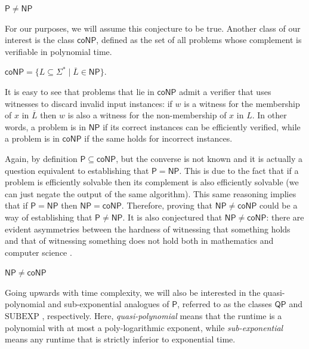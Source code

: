 \begin{conjecture}
  $\mathsf{P} \neq \mathsf{NP}$
\end{conjecture}

For our purposes, we will assume this conjecture to be true. Another class of our interest is the class $\mathsf{coNP}$, defined as the set of all problems whose complement is verifiable in polynomial time.

\begin{definition}
  $\mathsf{coNP} = \{L \subseteq \Sigma^* \mid \overline{L} \in \mathsf{NP}\}$.
\end{definition}

It is easy to see that problems that lie in $\mathsf{coNP}$ admit a verifier that uses witnesses to discard invalid input instances: if $w$ is a witness for the membership of $x$ in $\overline{L}$ then $w$ is also a witness for the non-membership of $x$ in $L$. In other words, a problem is in $\mathsf{NP}$ if its correct instances can be efficiently verified, while a problem is in $\mathsf{coNP}$ if the same holds for incorrect instances. 

Again, by definition $\mathsf{P} \subseteq \mathsf{coNP}$, but the converse is not known and it is actually a question equivalent to establishing that $\mathsf{P} = \mathsf{NP}$. This is due to the fact that if a problem is efficiently solvable then its complement is also efficiently solvable (we can just negate the output of the same algorithm). This same reasoning implies that if $\mathsf{P} = \mathsf{NP}$ then $\mathsf{NP} = \mathsf{coNP}$. Therefore, proving that $\mathsf{NP} \neq \mathsf{coNP}$ could be a way of establishing that $\mathsf{P} \neq \mathsf{NP}$. It is also conjectured that $\mathsf{NP} \neq \mathsf{coNP}$: there are evident asymmetries between the hardness of witnessing that something holds and that of witnessing something does not hold both in mathematics and computer science \cite{cook_proof_compx}.

\begin{conjecture}
  $\mathsf{NP} \neq \mathsf{coNP}$
\end{conjecture}

Going upwards with time complexity, we will also be interested in the quasi-polynomial and sub-exponential analogues of $\mathsf{P}$, referred to as the classes $\mathsf{QP}$ and $\mathrm{SUBEXP}$ \cite{arora_barak}, respectively. Here, \textit{quasi-polynomial} means that the runtime is a polynomial with at most a poly-logarithmic exponent, while \textit{sub-exponential} means any runtime that is strictly inferior to exponential time.

